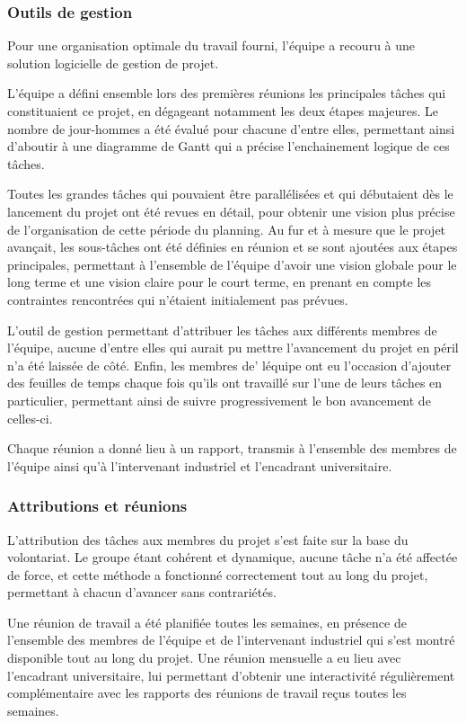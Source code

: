 \subsubsection{Outils de gestion}

Pour une organisation optimale du travail fourni, l'équipe a recouru à une solution logicielle de gestion de projet.

L'équipe a défini ensemble lors des premières réunions les principales tâches qui constituaient ce projet, en dégageant notamment les deux étapes majeures. Le nombre de jour-hommes a été évalué pour chacune d'entre elles, permettant ainsi d'aboutir à une diagramme de Gantt qui a précise l'enchainement logique de ces tâches.

Toutes les grandes tâches qui pouvaient être parallélisées et qui débutaient dès le lancement du projet ont été revues en détail, pour obtenir une vision plus précise de l'organisation de cette période du planning. Au fur et à mesure que le projet avançait, les sous-tâches ont été définies en réunion et se sont ajoutées aux étapes principales, permettant à l'ensemble de l'équipe d'avoir une vision globale pour le long terme et une vision claire pour le court terme, en prenant en compte les contraintes rencontrées qui n'étaient initialement pas prévues.

L'outil de gestion permettant d'attribuer les tâches aux différents membres de l'équipe, aucune d'entre elles qui aurait pu mettre l'avancement du projet en péril n'a été laissée de côté. Enfin, les membres de' léquipe ont eu l'occasion d'ajouter des feuilles de temps chaque fois qu'ils ont travaillé sur l'une de leurs tâches en particulier, permettant ainsi de suivre progressivement le bon avancement de celles-ci.

Chaque réunion a donné lieu à un rapport, transmis à l'ensemble des membres de l'équipe ainsi qu'à l'intervenant industriel et l'encadrant universitaire.

\subsubsection{Attributions et réunions}

L'attribution des tâches aux membres du projet s'est faite sur la base du volontariat. Le groupe étant cohérent et dynamique, aucune tâche n'a été affectée de force, et cette méthode a fonctionné correctement tout au long du projet, permettant à chacun d'avancer sans contrariétés.

Une réunion de travail a été planifiée toutes les semaines, en présence de l'ensemble des membres de l'équipe et de l'intervenant industriel qui s'est montré disponible tout au long du projet. Une réunion mensuelle a eu lieu avec l'encadrant universitaire, lui permettant d'obtenir une interactivité régulièrement complémentaire avec les rapports des réunions de travail reçus toutes les semaines.

